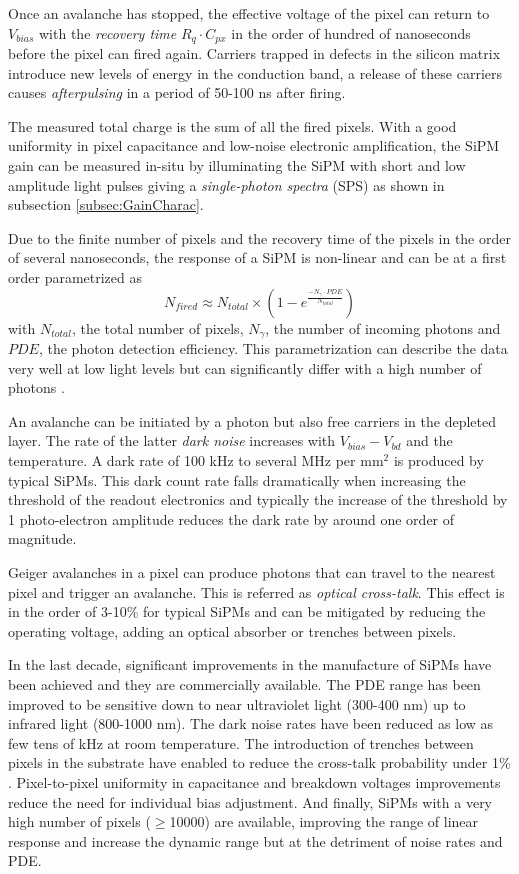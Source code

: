Once an avalanche has stopped, the effective voltage of the pixel can return to $V_{bias}$ with the \textit{recovery time} $R_q \cdot C_{px}$ in the order of hundred of nanoseconds before the pixel can fired again. Carriers trapped in defects in the silicon matrix introduce new levels of energy in the conduction band, a release of these carriers causes \textit{afterpulsing} in a period of 50-100 ns after firing.

The measured total charge is the sum of all the fired pixels. With a good uniformity in pixel capacitance and low-noise electronic amplification, the SiPM gain can be measured in-situ by illuminating the SiPM with short and low amplitude light pulses giving a \textit{single-photon spectra} (SPS) as shown in subsection \ref{subsec:GainCharac}.

Due to the finite number of pixels and the recovery time of the pixels in the order of several nanoseconds, the response of a SiPM is non-linear and can be at a first order parametrized as
\begin{equation}
  N_{fired} \approx N_{total} \times (1 - e^{\frac{- N_{\gamma} \cdot PDE}{N_{total}}})
\end{equation}
with $N_{total}$, the total number of pixels, $N_{\gamma}$, the number of incoming photons and $PDE$, the photon detection efficiency. This parametrization can describe the data very well at low light levels but can significantly differ with a high number of photons \cite{Kotera:2015rha}.

An avalanche can be initiated by a photon but also free carriers in the depleted layer. The rate of the latter \textit{dark noise} increases with $V_{bias} - V_{bd}$ and the temperature. A dark rate of 100 kHz to several MHz per mm$^2$ is produced by typical SiPMs. This dark count rate falls dramatically when increasing the threshold of the readout electronics and typically the increase of the threshold by 1 photo-electron amplitude reduces the dark rate by around one order of magnitude.

Geiger avalanches in a pixel can produce photons that can travel to the nearest pixel and trigger an avalanche. This is referred as \textit{optical cross-talk}. This effect is in the order of 3-10\% for typical SiPMs and can be mitigated by reducing the operating voltage, adding an optical absorber or trenches between pixels.

In the last decade, significant improvements in the manufacture of SiPMs have been achieved and they are commercially available. The PDE range has been improved to be sensitive down to near ultraviolet light (300-400 nm) up to infrared light (800-1000 nm). The dark noise rates have been reduced as low as few tens of kHz at room temperature. The introduction of trenches between pixels in the substrate have enabled to reduce the cross-talk probability under 1\% \cite{Liu:2015cpe}. Pixel-to-pixel uniformity in capacitance and breakdown voltages improvements reduce the need for individual bias adjustment. And finally, SiPMs with a very high number of pixels ($\geq$10000) are available, improving the range of linear response and increase the dynamic range but at the detriment of noise rates and PDE.

